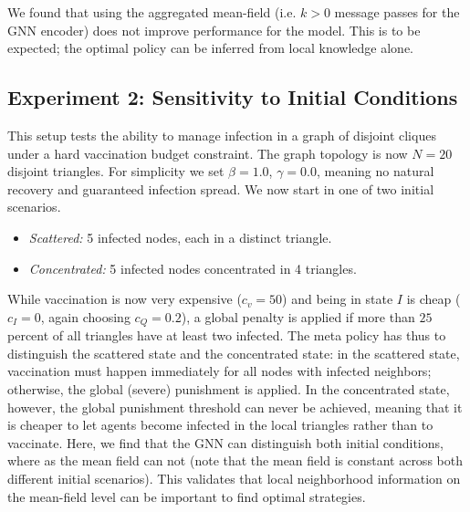 \documentclass{article}
\begin{document}
We found that using the aggregated mean-field (i.e. $k>0$ message passes for the GNN encoder) does not improve performance for the model. This is to be expected; the optimal policy can be inferred from local knowledge alone.


\subsection*{Experiment 2: Sensitivity to Initial Conditions}
\noindent This setup tests the ability to manage infection in a graph of disjoint cliques under a hard vaccination budget constraint.
The graph topology is now $N=20$ disjoint triangles.
For simplicity we set $\beta=1.0$, $\gamma=0.0$, meaning no natural recovery and guaranteed infection spread. We now start in one of two initial scenarios.
    \begin{itemize}
        \item \textit{Scattered:} 5 infected nodes, each in a distinct triangle.
        \item \textit{Concentrated:} 5 infected nodes concentrated in 4 triangles.
    \end{itemize}
While vaccination is now very expensive ($c_v = 50$) and being in state $I$ is cheap ($c_I = 0$, again choosing $c_Q = 0.2$), a global penalty is applied if more than $25$ percent of all triangles have at least two infected. The meta policy has thus to distinguish the scattered state and the concentrated state: in the scattered state, vaccination must happen immediately for all nodes with infected neighbors; otherwise, the global (severe) punishment is applied. In the concentrated state, however, the global punishment threshold can never be achieved, meaning that it is cheaper to let agents become infected in the local triangles rather than to vaccinate. Here, we find that the GNN can distinguish both initial conditions, where as the mean field can not (note that the mean field is constant across both different initial scenarios). This validates that local neighborhood information on the mean-field level can be important to find optimal strategies.
\end{document}
